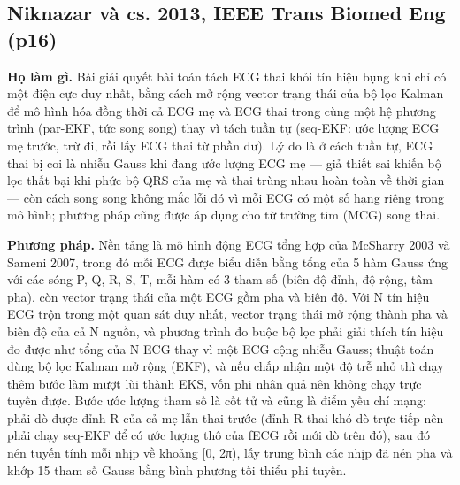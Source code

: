 \documentclass[12pt,a4paper]{article}
\begin{document}
\subsection{Niknazar và cs. 2013, IEEE Trans Biomed Eng \normalfont\small (p16)}
\par\vspace{2pt}
\par\vspace{4pt}
\noindent \textbf{Họ làm gì.} Bài giải quyết bài toán tách ECG thai khỏi tín hiệu bụng khi chỉ có một điện cực duy nhất, bằng cách mở rộng vector trạng thái của bộ lọc Kalman để mô hình hóa đồng thời cả ECG mẹ và ECG thai trong cùng một hệ phương trình (par-EKF, tức song song) thay vì tách tuần tự (seq-EKF: ước lượng ECG mẹ trước, trừ đi, rồi lấy ECG thai từ phần dư). Lý do là ở cách tuần tự, ECG thai bị coi là nhiễu Gauss khi đang ước lượng ECG mẹ — giả thiết sai khiến bộ lọc thất bại khi phức bộ QRS của mẹ và thai trùng nhau hoàn toàn về thời gian — còn cách song song không mắc lỗi đó vì mỗi ECG có một số hạng riêng trong mô hình; phương pháp cũng được áp dụng cho từ trường tim (MCG) song thai.\par\vspace{3pt}
\noindent \textbf{Phương pháp.} Nền tảng là mô hình động ECG tổng hợp của McSharry 2003 và Sameni 2007, trong đó mỗi ECG được biểu diễn bằng tổng của 5 hàm Gauss ứng với các sóng P, Q, R, S, T, mỗi hàm có 3 tham số (biên độ đỉnh, độ rộng, tâm pha), còn vector trạng thái của một ECG gồm pha và biên độ. Với N tín hiệu ECG trộn trong một quan sát duy nhất, vector trạng thái mở rộng thành pha và biên độ của cả N nguồn, và phương trình đo buộc bộ lọc phải giải thích tín hiệu đo được như tổng của N ECG thay vì một ECG cộng nhiễu Gauss; thuật toán dùng bộ lọc Kalman mở rộng (EKF), và nếu chấp nhận một độ trễ nhỏ thì chạy thêm bước làm mượt lùi thành EKS, vốn phi nhân quả nên không chạy trực tuyến được. Bước ước lượng tham số là cốt tử và cũng là điểm yếu chí mạng: phải dò được đỉnh R của cả mẹ lẫn thai trước (đỉnh R thai khó dò trực tiếp nên phải chạy seq-EKF để có ước lượng thô của fECG rồi mới dò trên đó), sau đó nén tuyến tính mỗi nhịp về khoảng [0, 2π), lấy trung bình các nhịp đã nén pha và khớp 15 tham số Gauss bằng bình phương tối thiểu phi tuyến.\par\vspace{3pt}
\end{document}
